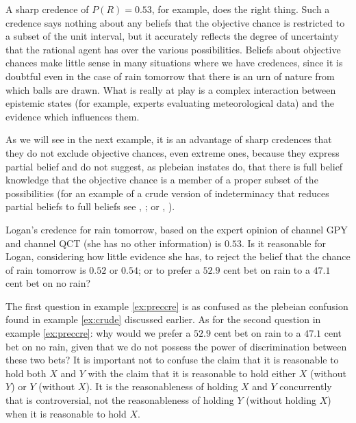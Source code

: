\documentclass[12pt]{article}
\begin{document}
A sharp credence of $P(R)=0.53$, for example, does the right thing.
Such a credence says nothing about any beliefs that the objective
chance is restricted to a subset of the unit interval, but it
accurately reflects the degree of uncertainty that the rational agent
has over the various possibilities. Beliefs about objective chances
make little sense in many situations where we have credences, since it
is doubtful even in the case of rain tomorrow that there is an urn of
nature from which balls are drawn. What is really at play is a complex
interaction between epistemic states (for example, experts evaluating
meteorological data) and the evidence which influences them.

As we will see in the next example, it is an advantage of sharp
credences that they do not exclude objective chances, even extreme
ones, because they express partial belief and do not suggest, as
plebeian instates do, that there is full belief knowledge that the
objective chance is a member of a proper subset of the possibilities
(for an example of a crude version of indeterminacy that reduces
partial beliefs to full beliefs see ,
; or ,
).

\begin{quotex}
  \label{ex:preccre} Logan's credence for
  rain tomorrow, based on the expert opinion of channel GPY and
  channel QCT (she has no other information) is $0.53$. Is it
  reasonable for Logan, considering how little evidence she has, to
  reject the belief that the chance of rain tomorrow is $0.52$ or
  $0.54$; or to prefer a $52.9$ cent bet on rain to a $47.1$ cent bet
  on no rain?
\end{quotex}

The first question in example \ref{ex:preccre} is as confused as the
plebeian confusion found in example \ref{ex:crude} discussed earlier.
As for the second question in example \ref{ex:preccre}: why would we
prefer a $52.9$ cent bet on rain to a $47.1$ cent bet on no rain,
given that we do not possess the power of discrimination between these
two bets? It is important not to confuse the claim that it is
reasonable to hold both $X$ and $Y$ with the claim that it is
reasonable to hold either $X$ (without $Y$) or $Y$ (without $X$). It
is the reasonableness of holding $X$ and $Y$ concurrently that is
controversial, not the reasonableness of holding $Y$ (without holding
$X$) when it is reasonable to hold $X$.
\end{document}
